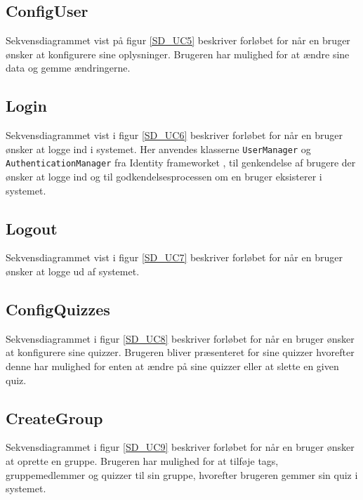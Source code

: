 
\subsection*{ConfigUser}
Sekvensdiagrammet vist på figur \ref{SD_UC5} beskriver forløbet for når en bruger ønsker at konfigurere sine oplysninger. Brugeren har mulighed for at ændre sine data og gemme ændringerne.


\subsection*{Login}
Sekvensdiagrammet vist i figur \ref{SD_UC6} beskriver forløbet for når en bruger ønsker at logge ind i systemet. Her anvendes klasserne \verb+UserManager+ og \verb+AuthenticationManager+ fra Identity frameworket \citep{msdnIdentityFrameworkWeb}, til genkendelse af brugere der ønsker at logge ind og til godkendelsesprocessen om en bruger eksisterer i systemet.


\subsection*{Logout}
Sekvensdiagrammet vist i figur \ref{SD_UC7} beskriver forløbet for når en bruger ønsker at logge ud af systemet.


\subsection*{ConfigQuizzes}
Sekvensdiagrammet i figur \ref{SD_UC8} beskriver forløbet for når en bruger ønsker at konfigurere sine quizzer. Brugeren bliver præsenteret for sine quizzer hvorefter denne har mulighed for enten at ændre på sine quizzer eller at slette en given quiz.


\subsection*{CreateGroup}
Sekvensdiagrammet i figur \ref{SD_UC9} beskriver forløbet for når en bruger ønsker at oprette en gruppe. Brugeren har mulighed for at tilføje tags, gruppemedlemmer og quizzer til sin gruppe, hvorefter brugeren gemmer sin quiz i systemet.

